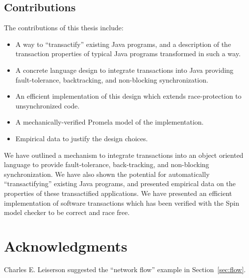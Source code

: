 \documentclass[12pt,oneside]{article}
\newcommand{\note}[1]{}%
\newcommand{\punt}[1]{}%
\newcommand{\subsecput}[2]{\subsection{#2}\label{sec:#1}}
\newcommand{\figref}[1]         {Figure~\ref{fig:#1}}
\newcommand{\secref}[1]         {Section~\ref{sec:#1}}
\begin{document}
\subsecput{contrib}{Contributions}
The contributions of this thesis include:
\begin{itemize}
\item A way to ``transactify'' existing Java programs, and a
  description of the transaction properties of typical Java programs
  transformed in such a way.
\item A concrete language design to integrate transactions into Java
  providing fault-tolerance, backtracking, and non-blocking
  synchronization.
\item An efficient implementation of this design which extends
  race-protection to unsynchronized code.
\item A mechanically-verified Promela model of the implementation.
\item Empirical data to justify the design choices.
\punt{
\item Compiler optimizations to improve the speed of software
  transactions.
\item An application of fast functional arrays to solve the ``large
  object'' problem with Herlihy's universal non-blocking protocol.
  \note{Short section; cite my Area Exam as a Technical Report here
  for more details. Omit this?}
\item A variation of the implementation which leverages hardware
  support for small transactions.  This allows hardware small
  transactions to be bootstrapped to provide efficient large
  transactions.
}
\end{itemize}

We have outlined a mechanism to integrate transactions into an object
oriented language to provide fault-tolerance, back-tracking, and
non-blocking synchronization.  We have also shown the potential for
automatically ``transactifying'' existing Java programs, and presented
empirical data on the properties of these transactified applications.
We have
presented an efficient implementation of software transactions which
has been verified with the Spin model checker to be correct and race
free.

\section*{Acknowledgments}
Charles E. Leiserson suggested the ``network flow'' example in
\secref{flow}.
\punt{Sean Lie adapted the hardware simulator which
provided the timings in \figref{hw-timings}.}
\end{document}

